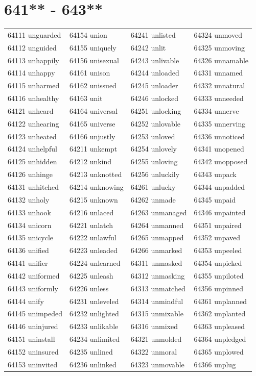 \documentclass[10pt, oneside]{book}
\begin{document}
\begin{table}
	\centering
	\section*{641** - 643**}
	\begin{tabular}{l l l l}
64111 unguarded &64154 union &64241 unlisted &64324 unmoved\\
64112 unguided &64155 uniquely &64242 unlit &64325 unmoving\\
64113 unhappily &64156 unisexual &64243 unlivable &64326 unnamable\\
64114 unhappy &64161 unison &64244 unloaded &64331 unnamed\\
64115 unharmed &64162 unissued &64245 unloader &64332 unnatural\\
64116 unhealthy &64163 unit &64246 unlocked &64333 unneeded\\
64121 unheard &64164 universal &64251 unlocking &64334 unnerve\\
64122 unhearing &64165 universe &64252 unlovable &64335 unnerving\\
64123 unheated &64166 unjustly &64253 unloved &64336 unnoticed\\
64124 unhelpful &64211 unkempt &64254 unlovely &64341 unopened\\
64125 unhidden &64212 unkind &64255 unloving &64342 unopposed\\
64126 unhinge &64213 unknotted &64256 unluckily &64343 unpack\\
64131 unhitched &64214 unknowing &64261 unlucky &64344 unpadded\\
64132 unholy &64215 unknown &64262 unmade &64345 unpaid\\
64133 unhook &64216 unlaced &64263 unmanaged &64346 unpainted\\
64134 unicorn &64221 unlatch &64264 unmanned &64351 unpaired\\
64135 unicycle &64222 unlawful &64265 unmapped &64352 unpaved\\
64136 unified &64223 unleaded &64266 unmarked &64353 unpeeled\\
64141 unifier &64224 unlearned &64311 unmasked &64354 unpicked\\
64142 uniformed &64225 unleash &64312 unmasking &64355 unpiloted\\
64143 uniformly &64226 unless &64313 unmatched &64356 unpinned\\
64144 unify &64231 unleveled &64314 unmindful &64361 unplanned\\
64145 unimpeded &64232 unlighted &64315 unmixable &64362 unplanted\\
64146 uninjured &64233 unlikable &64316 unmixed &64363 unpleased\\
64151 uninstall &64234 unlimited &64321 unmolded &64364 unpledged\\
64152 uninsured &64235 unlined &64322 unmoral &64365 unplowed\\
64153 uninvited &64236 unlinked &64323 unmovable &64366 unplug\\
	\end{tabular}
 \end{table}
\clearpage
\end{document}
